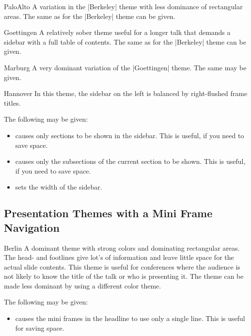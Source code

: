 \begin{themeexample}{PaloAlto}
  A variation in the |Berkeley| theme with less dominance of
  rectangular areas. The same  as for the |Berkeley|
  theme can be given. 
\end{themeexample}

\begin{themeexample}{Goettingen}
  A relatively sober theme useful for a longer talk that demands a
  sidebar with a full table of contents.  The same  as
  for the |Berkeley| theme can be given. 
\end{themeexample}

\begin{themeexample}{Marburg}
  A very dominant variation of the |Goettingen| theme. The same
   may be given.
\end{themeexample}

\begin{themeexample}{Hannover}
  In this theme, the sidebar on the left is balanced by
  right-flushed frame titles.
    
  The following  may be given:
  \begin{itemize}
  \item {} causes only sections to be
    shown in the sidebar. This is useful, if you need to save
    space.
  \item {} causes only the subsections
    of the current section to be shown. This is useful, if you need to
    save  space.      
  \item {} sets the width of the
    sidebar.
  \end{itemize}
\end{themeexample}




\subsection{Presentation Themes with a Mini Frame Navigation}

\begin{themeexample}{Berlin}
  A dominant theme with strong colors and dominating rectangular
  areas. The head- and footlines give lot's of information and leave
  little space for the actual slide contents. This theme is useful for
  conferences where the audience is not likely to know the title of
  the talk or who is presenting it.  The theme can be made less
  dominant by using a different color theme.
  
  The following  may be given:
  \begin{itemize}
  \item {} causes the mini frames in the headline to
    use only a single line. This is useful for saving space.
  \end{itemize}
\end{themeexample}

